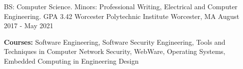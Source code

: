 

\begin{cventries}

  \cventry
    {BS: Computer Science. Minors: Professional Writing, Electrical and Computer Engineering. GPA 3.42 } %
    {Worcester Polytechnic Institute} %
    {Worcester, MA} %
    {August 2017 - May 2021} %
    {
      \begin{cvitems} %
        \item {\textbf{Courses:} Software Engineering, Software Security Engineering, Tools and Techniques in Computer Network Security, WebWare, Operating Systems, Embedded Computing in Engineering Design}
      \end{cvitems}
    }
\end{cventries}
